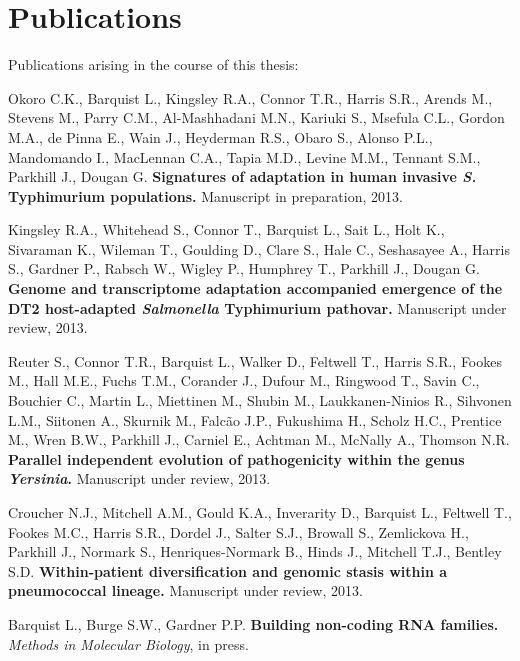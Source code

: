 \chapter{Publications}

Publications arising in the course of this thesis:

\itemize

\item{Okoro C.K., Barquist L., Kingsley R.A., Connor T.R., Harris S.R., Arends M., Stevens M., Parry C.M., Al-Mashhadani M.N., Kariuki S., Msefula C.L., Gordon M.A., de Pinna E., Wain J., Heyderman R.S., Obaro S., Alonso P.L., Mandomando I., MacLennan C.A., Tapia M.D., Levine M.M., Tennant S.M., Parkhill J., Dougan G.  \textbf{Signatures of adaptation in human invasive {\it S.} Typhimurium populations.} Manuscript in preparation, 2013.} 

\item{Kingsley R.A., Whitehead S., Connor T., Barquist L., Sait L., Holt K., Sivaraman K., Wileman T., Goulding D., Clare S., Hale C., Seshasayee A., Harris S., Gardner P., Rabsch W., Wigley P., Humphrey T., Parkhill J., Dougan G. \textbf{Genome and transcriptome adaptation accompanied emergence of the DT2 host-adapted \textit{Salmonella} Typhimurium pathovar.} Manuscript under review, 2013.}

\item{Reuter S., Connor T.R., Barquist L., Walker D., Feltwell T., Harris S.R., Fookes M., Hall M.E., Fuchs T.M., Corander J., Dufour M., Ringwood T., Savin C., Bouchier C., Martin L., Miettinen M., Shubin M., Laukkanen-Ninios R., Sihvonen L.M., Siitonen A., Skurnik M., Falc\~{a}o J.P., Fukushima H., Scholz H.C., Prentice M., Wren B.W., Parkhill J., Carniel E., Achtman M., McNally A., Thomson N.R. \textbf{Parallel independent evolution of pathogenicity within the genus \textit{Yersinia}.} Manuscript under review, 2013.}

\newpage

\item{Croucher N.J., Mitchell A.M., Gould K.A., Inverarity D., Barquist L., Feltwell T., Fookes M.C., Harris S.R., Dordel J., Salter S.J., Browall S., Zemlickova H., Parkhill J., Normark S., Henriques-Normark B., Hinds J., Mitchell T.J., Bentley S.D. \textbf{Within-patient diversification and genomic stasis within a pneumococcal lineage.} Manuscript under review, 2013.} 

\item{Barquist L., Burge S.W., Gardner P.P. \textbf{Building non-coding RNA families.} \textit{Methods in Molecular Biology}, in press.} 

